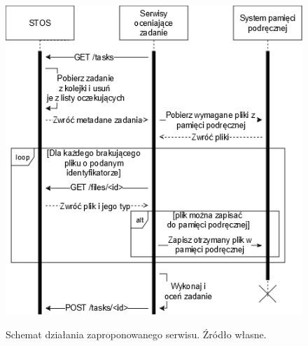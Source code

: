 \begin{figure}[!h]
	\begin{center}
		\resizebox{1.0\textwidth}{!} {
			\includegraphics{img/5/stos-suggestion.png}
		}
		\caption[Schemat działania zaproponowanego serwisu. Źródło własne.]{Schemat działania zaproponowanego serwisu. Źródło własne.}
    \label{stos-suggestion}
	\end{center}
\end{figure}
